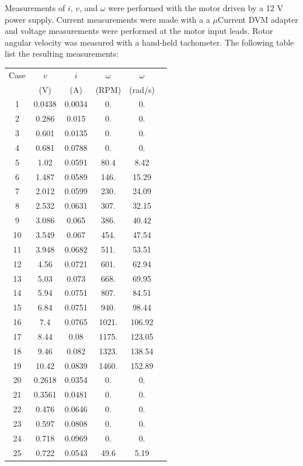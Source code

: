 \documentclass[12pt,letterpaper]{article}
\begin{document}
\begin{appendices}
Measurements of $i$, $v$, and $\omega$ were performed with the motor driven by a 12 V power supply.  Current measurements were made with a  a $\mu$Current DVM adapter and voltage measurements were 
performed at the motor input leads.  Rotor angular velocity was measured with a hand-held tachometer.  The following table list the resulting measurements:

\begin{tabular}{|c|c|c|c|cl}
\hline
Case & $v$ & $i$ & $\omega$ & $\omega$ \\
      & (V) &  (A) & (RPM) & (rad/s) \\
\hline
1	& 0.0438	& 0.0034	& 0.	& 0. \\
2	& 0.286	& 0.015	& 0.	& 0. \\
3	& 0.601	& 0.0135	& 0.	& 0. \\
4	& 0.681	& 0.0788	& 0.	& 0. \\
5	& 1.02	& 0.0591	& 80.4	& 8.42 \\
6	& 1.487	& 0.0589	& 146.	& 15.29 \\
7	& 2.012	& 0.0599	& 230.	& 24.09 \\
8	& 2.532	& 0.0631	& 307.	& 32.15 \\
9	& 3.086	& 0.065	& 386.	& 40.42 \\
10	& 3.549	& 0.067	& 454.	& 47.54 \\
11	& 3.948	& 0.0682	& 511.	& 53.51 \\
12	& 4.56	& 0.0721	& 601.	& 62.94 \\
13	& 5.03	& 0.073	& 668.	& 69.95 \\
14	& 5.94	& 0.0751	& 807.	& 84.51 \\
15	& 6.84	& 0.0751	& 940.	& 98.44 \\
16	& 7.4	& 0.0765	& 1021.	& 106.92 \\
17	& 8.44	& 0.08	& 1175.	& 123.05 \\
18	& 9.46	& 0.082	& 1323.	& 138.54 \\
19	& 10.42	& 0.0839	& 1460.	& 152.89 \\
20	& 0.2618	& 0.0354	& 0.	& 0. \\
21	& 0.3561	& 0.0481	& 0.	& 0. \\
22	& 0.476	& 0.0646	& 0.	& 0. \\
23	& 0.597	& 0.0808	& 0.	& 0. \\
24	& 0.718	& 0.0969	& 0.	& 0. \\
25	& 0.722	& 0.0543	& 49.6	& 5.19 \\
\hline
\end{tabular}


\end{appendices}
\end{document}
